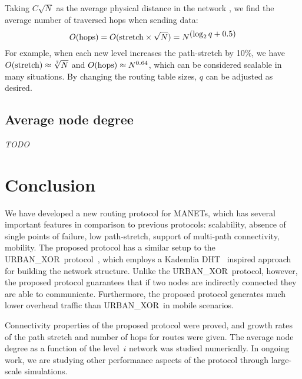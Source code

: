 \documentclass[conference]{IEEEtran}
\theoremstyle{definition}
\newcommand{\urbanxor}{URBAN\_XOR}
\begin{document}
Taking $C\sqrt{N}$ as the average physical distance in the network \cite{Kleinrock}, we find the average number of traversed hops when sending data:
\begin{equation*}
    O({\rm hops}) = O( {\rm stretch} \times \sqrt{N}) = N^{\displaystyle (\log_2 q + 0.5)}
\end{equation*}
For example, when each new level increases the path-stretch by 10\%, we have $O({\rm stretch}) \approx \sqrt[7]{N}$ and $O({\rm hops}) \approx N^{0.64}$, which can be considered scalable in many situations. By changing the routing table sizes, $q$ can be adjusted as desired.

\subsection{Average node degree}
\emph{TODO}


\section{Conclusion}
\label{sec:conclusion}

We have developed a new routing protocol for MANETs, which has several important features
in comparison to previous protocols:
scalability, absence of single points of failure, low path-stretch, support of multi-path connectivity, mobility.
The proposed protocol has a similar setup to the
\urbanxor\ protocol~\cite{Pasquini}, which employs a Kademlia DHT~\cite{kademlia} inspired approach for building the network structure.  Unlike the \urbanxor\ protocol, however, the proposed protocol guarantees that if two nodes
are indirectly connected they are able to communicate.  Furthermore, the proposed protocol generates much lower overhead
traffic than \urbanxor\ in mobile scenarios.  

Connectivity properties of the proposed protocol were proved, and growth rates of the path stretch and number of hops for routes were given.  The average node degree as a function of the level~$i$ network was studied numerically.  In ongoing work, we are studying other performance aspects of the protocol through large-scale simulations.



\end{document}
